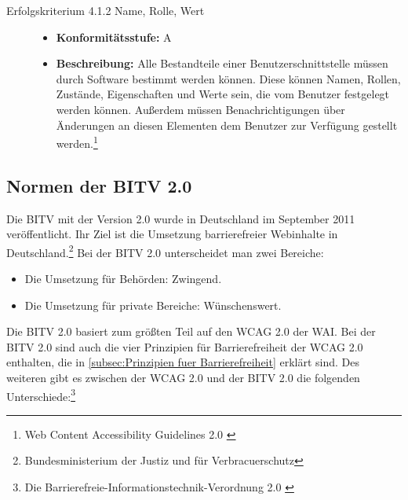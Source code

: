 \begin{description}
\begin{description}
		\item[Erfolgskriterium 4.1.2 Name, Rolle, Wert]\hfill
		\begin{itemize}
			\item \textbf{Konformitätsstufe:} A
			\item \textbf{Beschreibung:} Alle Bestandteile einer Benutzerschnittstelle müssen durch Software bestimmt werden können. Diese können 
			Namen, Rollen, Zustände, Eigenschaften und Werte sein, die vom Benutzer festgelegt werden können. Außerdem müssen Benachrichtigungen über Änderungen 
			an diesen Elementen dem Benutzer zur Verfügung gestellt werden.\footnote{Web Content Accessibility Guidelines 2.0 \cite{WCAG2.0}}
		\end{itemize}
	\end{description}
\end{description}

\subsection{Normen der \ac{BITV} 2.0}
\label{subsec: BITV}
Die \ac{BITV} mit der Version 2.0 wurde in Deutschland im September 2011 veröffentlicht. Ihr Ziel ist die Umsetzung barrierefreier Webinhalte in Deutschland.\footnote{Bundesministerium der Justiz und für Verbracuerschutz\cite{BITV}} Bei der \ac{BITV} 2.0 unterscheidet man zwei Bereiche:

\begin{itemize}
	\item Die Umsetzung für Behörden: Zwingend.
	\item Die Umsetzung für private Bereiche: Wünschenswert.
\end{itemize}

Die \ac{BITV} 2.0 basiert zum größten Teil auf den \ac{WCAG} 2.0 der \ac{WAI}. Bei der \ac{BITV} 2.0 sind auch die vier Prinzipien für Barrierefreiheit der \ac{WCAG} 2.0  enthalten, die in \cref{subsec:Prinzipien fuer Barrierefreiheit} erklärt sind. Des weiteren gibt es zwischen der \ac{WCAG} 2.0 und der \ac{BITV} 2.0 die folgenden Unterschiede:\footnote{Die Barrierefreie-Informationstechnik-Verordnung 2.0 \cite{BITV}}

